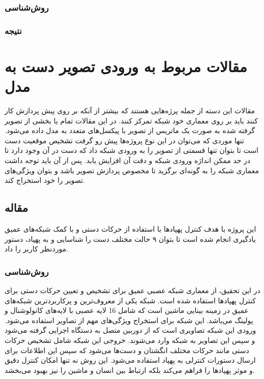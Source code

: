 \subsubsection{روش‌شناسی}

\subsubsection{نتیجه}
\cite{sharma2020hand}



\section{مقالات مربوط به ورودی تصویر دست به مدل}
مقالات این دسته از جمله پرژه‌هایی هستند که بیشتر از آنکه بر روی پیش پردازش کار کنند باید بر روی معماری خود شبکه تمرکز کنند. در این مقالات تمام یا بخشی از تصویر گرفته شده به صورت یک ماتریس از تصویر با پیکسل‌های متعدد به مدل داده می‌شود. تنها موردی که می‌توان در این نوع پروژه‌ها پیش رو گرفت تشخیص موقعیت دست است تا بتوان تنها قسمتی از تصویر را به ورودی شبکه داد که دست در آن وجود دارد تا در حد ممکن انداژه ورودی شبکه و دقت آن افزایش یابد. پس از آن باید توجه داشت معماری شبکه را به گونه‌ای برگزید تا مخصوص پردازش تصویر باشد و بتوان ویژگی‌های تصویر را خود استخراج کند.


\subsection{مقاله }
این پروژه با هدف کنترل پهپادها با استفاده از حرکات دستی و با کمک شبکه‌های عمیق یادگیری انجام شده است تا بتوان ۹ حالت مختلف دست را شناسایی و به پهپاد، دستور موردنظر کاربر را داد.


\subsubsection{روش‌شناسی}
در این تحقیق، از معماری شبکه عصبی عمیق  برای تشخیص و تعیین حرکات دستی برای کنترل پهپادها استفاده شده است. شبکه  یکی از معروف‌ترین و پرکاربردترین شبکه‌های عمیق در زمینه بینایی ماشین است که 
شامل 16 لایه عصبی با لایه‌های کانولوشنال و پولینگ می‌باشد. این شبکه برای استخراج ویژگی‌های مهم از تصاویر استفاده می‌شود. ورودی این شبکه تصاویری است که از دوربین متصل به دستگاه اجرایی گرفته می‌شود و سپس این 
تصاویر به شبکه وارد می‌شوند. خروجی این شبکه شامل تشخیص حرکات دستی مانند حرکات مختلف انگشتان و دست‌ها می‌شود که سپس این اطلاعات برای ارسال دستورات کنترلی به پهپاد استفاده می‌شود. این روش نه تنها امکان کنترل دقیق 
و موثر پهپادها را فراهم می‌کند بلکه ارتباط بین انسان و ماشین را نیز بهبود می‌بخشد.

